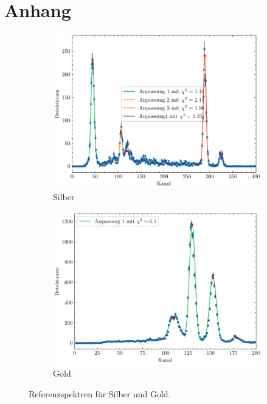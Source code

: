 \section*{Anhang}\label{sec:anhang}
\begin{figure}[H]
    \centering
    \begin{subfigure}{0.45\textwidth}
        \centering
        \includegraphics[width=\linewidth]{../figs/Ag}
        \caption{Silber}
    \end{subfigure}
    \begin{subfigure}{0.45\textwidth}
        \centering
        \includegraphics[width=\linewidth]{../figs/Au}
        \caption{Gold}
    \end{subfigure}
    \caption{Referenzspektren für Silber und Gold.}\label{fig:ag_au}
\end{figure}
